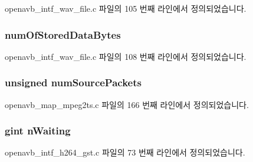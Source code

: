 openavb\+\_\+intf\+\_\+wav\+\_\+file.\+c 파일의 105 번째 라인에서 정의되었습니다.

\subsubsection[{\texorpdfstring{num\+Of\+Stored\+Data\+Bytes}{numOfStoredDataBytes}}]{ num\+Of\+Stored\+Data\+Bytes}\hypertarget{structpvt__data__t_aaace30e2d4f45024fd9d6e965b3ce99b}{}\label{structpvt__data__t_aaace30e2d4f45024fd9d6e965b3ce99b}


openavb\+\_\+intf\+\_\+wav\+\_\+file.\+c 파일의 108 번째 라인에서 정의되었습니다.

\subsubsection[{\texorpdfstring{num\+Source\+Packets}{numSourcePackets}}]{\setlength{\rightskip}{0pt plus 5cm}unsigned num\+Source\+Packets}\hypertarget{structpvt__data__t_a8c71e240a0df348901568256de6c382b}{}\label{structpvt__data__t_a8c71e240a0df348901568256de6c382b}


openavb\+\_\+map\+\_\+mpeg2ts.\+c 파일의 166 번째 라인에서 정의되었습니다.

\subsubsection[{\texorpdfstring{n\+Waiting}{nWaiting}}]{\setlength{\rightskip}{0pt plus 5cm}gint n\+Waiting}\hypertarget{structpvt__data__t_a8f3382ecb9f43a47a26e41407422d27b}{}\label{structpvt__data__t_a8f3382ecb9f43a47a26e41407422d27b}


openavb\+\_\+intf\+\_\+h264\+\_\+gst.\+c 파일의 73 번째 라인에서 정의되었습니다.

